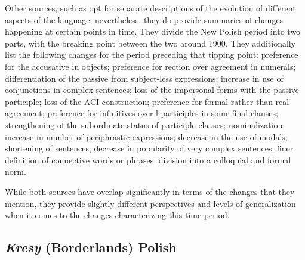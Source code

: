 Other sources, such as \citet{długosz-kurczabowa_dubisz_2006} opt for separate descriptions of the evolution of different aspects of the language; nevertheless, they do provide summaries of changes happening at certain points in time. They divide the New Polish period into two parts, with the breaking point between the two around 1900. They additionally list the following changes for the period preceding that tipping point: preference for the accusative in objects; preference for rection over agreement in numerals; differentiation of the passive from subject-less expressions; increase in use of conjunctions in complex sentences; loss of the impersonal forms with the passive participle; loss of the ACI construction; preference for formal rather than real agreement; preference for infinitives over l-participles in some final clauses; strengthening of the subordinate status of participle clauses; nominalization; increase in number of periphrastic expressions; decrease in the use of modals; shortening of sentences, decrease in popularity of very complex sentences; finer definition of connective words or phrases; division into a colloquial and formal norm. 

While both sources have overlap significantly in terms of the changes that they mention, they provide slightly different perspectives and levels of generalization when it comes to the changes characterizing this time period.


\subsection{\textit{Kresy} (Borderlands) Polish}
\label{subsec:history-kresy}

